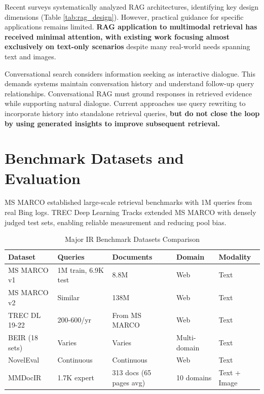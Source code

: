 Recent surveys \cite{gao2023retrieval} systematically analyzed RAG architectures, identifying key design dimensions (Table \ref{tab:rag_design}). However, practical guidance for specific applications remains limited. \textbf{RAG application to multimodal retrieval has received minimal attention, with existing work focusing almost exclusively on text-only scenarios} despite many real-world needs spanning text and images.

Conversational search \cite{mo2024survey} considers information seeking as interactive dialogue. This demands systems maintain conversation history and understand follow-up query relationships. Conversational RAG must ground responses in retrieved evidence while supporting natural dialogue. Current approaches use query rewriting to incorporate history into standalone retrieval queries, \textbf{but do not close the loop by using generated insights to improve subsequent retrieval.}

\section{Benchmark Datasets and Evaluation}

MS MARCO \cite{nguyen2016ms} established large-scale retrieval benchmarks with 1M queries from real Bing logs. TREC Deep Learning Tracks \cite{craswell2020overview, craswell2021overview, craswell2022overview} extended MS MARCO with densely judged test sets, enabling reliable measurement and reducing pool bias.

\begin{table}[h]
\centering
\caption{Major IR Benchmark Datasets Comparison}
\label{tab:benchmark_comparison}
\small
\begin{tabular}{lllll}
\toprule
\textbf{Dataset} & \textbf{Queries} & \textbf{Documents} & \textbf{Domain} & \textbf{Modality} \\
\midrule
MS MARCO v1 & 1M train, 6.9K test & 8.8M & Web & Text \\
MS MARCO v2 & Similar & 138M & Web & Text \\
TREC DL 19-22 & 200-600/yr & From MS MARCO & Web & Text \\
BEIR (18 sets) & Varies & Varies & Multi-domain & Text \\
NovelEval & Continuous & Continuous & Web & Text \\
\midrule
MMDocIR & 1.7K expert & 313 docs (65 pages avg) & 10 domains & Text + Image \\
\bottomrule
\end{tabular}
\end{table}

